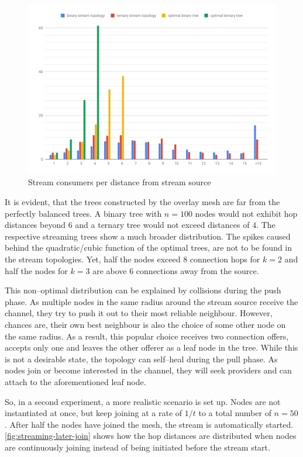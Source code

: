 \begin{figure}
\centering
\includegraphics[width=1\textwidth]{graphics/analysis/streaming-topology-histogram.pdf}
\caption{Stream consumers per distance from stream source}
\label{fig:streaming-topology-histogram}
\end{figure}

It is evident, that the trees constructed by the overlay mesh are far from the perfectly balanced trees. A binary tree with $n=100$ nodes would not exhibit hop distances beyond $6$ and a ternary tree would not exceed distances of $4$. The respective streaming trees show a much broader distribution. The spikes caused behind the quadratic/cubic function of the optimal trees, are not to be found in the stream topologies. Yet, half the nodes exceed $8$ connection hops for $k=2$ and half the nodes for $k=3$ are above $6$ connections away from the source.

This non–optimal distribution can be explained by collisions during the push phase. As multiple nodes in the same radius around the stream source receive the channel, they try to push it out to their most reliable neighbour. However, chances are, their own best neighbour is also the choice of some other node on the same radius. As a result, this popular choice receives two connection offers, accepts only one and leaves the other offerer as a leaf node in the tree. While this is not a desirable state, the topology can self–heal during the pull phase. As nodes join or become interested in the channel, they will seek providers and can attach to the aforementioned leaf node.

So, in a second experiment, a more realistic scenario is set up. Nodes are not instantiated at once, but keep joining at a rate of $1/t$ to a total number of $n=50$. After half the nodes have joined the mesh, the stream is automatically started. \vref{fig:streaming-later-join} shows how the hop distances are distributed when nodes are continuously joining instead of being initiated before the stream start.

